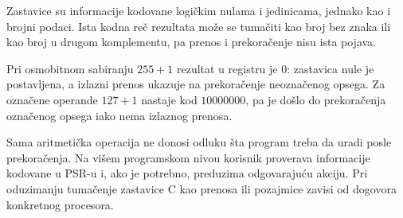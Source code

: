 Zastavice su informacije kodovane logičkim nulama i jedinicama, jednako kao i brojni podaci. Ista kodna reč rezultata može se tumačiti kao broj bez znaka ili kao broj u drugom komplementu, pa prenos i prekoračenje nisu ista pojava.

Pri osmobitnom sabiranju $255+1$ rezultat u registru je $0$: zastavica nule je postavljena, a izlazni prenos ukazuje na prekoračenje neoznačenog opsega. Za označene operande $127+1$ nastaje kod $10000000$, pa je došlo do prekoračenja označenog opsega iako nema izlaznog prenosa.

Sama aritmetička operacija ne donosi odluku šta program treba da uradi posle prekoračenja. Na višem programskom nivou korisnik proverava informacije kodovane u PSR-u i, ako je potrebno, preduzima odgovarajuću akciju. Pri oduzimanju tumačenje zastavice C kao prenosa ili pozajmice zavisi od dogovora konkretnog procesora.
